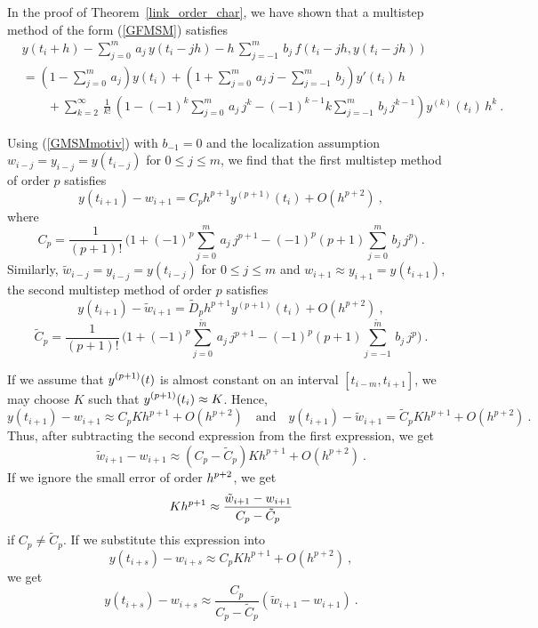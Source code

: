 In the proof of Theorem~\ref{link_order_char}, we have shown that a
multistep method of the form (\ref{GFMSM}) satisfies
\begin{align}
& y(t_i+h) - \sum_{j=0}^m\,a_j\,y(t_i-jh)
-h\,\sum_{j=-1}^m\,b_j\,f(t_i-jh,y(t_i-jh)) \nonumber \\
&= \left( 1 - \sum_{j=0}^m\,a_j \right) y(t_i)
+ \left( 1 + \sum_{j=0}^m\,a_j\,j - \sum_{j=-1}^m\,b_j\right) y'(t_i)\,h
\nonumber \\
&\qquad
+ \sum_{k=2}^\infty\,\frac{1}{k!}\,\left( 1 - (-1)^k \sum_{j=0}^m\,a_j\,j^k
- (-1)^{k-1} k \sum_{j=-1}^m\,b_j\, j^{k-1}\right) y^{(k)}(t_i)\,h^k \ .
\label{GMSMmotiv}
\end{align}

Using (\ref{GMSMmotiv}) with $b_{-1}=0$ and the localization assumption 
$w_{i-j} = y_{i-j} = y(t_{i-j})$ for $0 \leq j \leq m$, we find that
the first multistep method of order $p$ satisfies
\begin{equation} \label{VSSE1}
y(t_{i+1}) - w_{i+1} = C_p h^{p+1} y^{(p+1)}(t_i) + O(h^{p+2}) \ ,
\end{equation}
where
\[
C_p = \frac{1}{(p+1)!}\,\bigg( 1 + (-1)^p \sum_{j=0}^m\,a_j\,j^{p+1}
- (-1)^p (p+1) \sum_{j=0}^m\,b_j\, j^p\bigg) \ .
\]
Similarly, $\tilde{w}_{i-j} = y_{i-j} = y(t_{i-j})$ for $0 \leq j \leq m$
and $w_{i+1} \approx y_{i+1} = y(t_{i+1})$, the second multistep method of
order $p$ satisfies
\begin{equation} \label{VSSE2}
y(t_{i+1}) - \tilde{w}_{i+1} = \tilde{D}_p h^{p+1} y^{(p+1)}(t_i) + O(h^{p+2})
\ ,
\end{equation}
\[
\tilde{C}_p = \frac{1}{(p+1)!}\,\bigg( 1
+ (-1)^p \sum_{j=0}^{\tilde{m}}\,a_j\,j^{p+1}
- (-1)^p (p+1) \sum_{j=-1}^{\tilde{m}}\,b_j\, j^p\bigg) \ .
\]

If we assume that $\displaystyle y^{(p+1)}(t)$ is almost constant on an interval
$[t_{i-m},t_{i+1}]$, we may choose $K$ such that
$\displaystyle y^{(p+1)}(t_i) \approx K$.  Hence,
\[
y(t_{i+1}) - w_{i+1} \approx C_p K h^{p+1} + O(h^{p+2})
\quad\text{and} \quad
y(t_{i+1}) - \tilde{w}_{i+1} = \tilde{C}_p K h^{p+1} + O(h^{p+2}) \ .
\]
Thus, after subtracting the second expression from the first
expression, we get
\[
\tilde{w}_{i+1} - w_{i+1} \approx
(C_p - \tilde{C}_p) K h^{p+1} + O(h^{p+2}) \ .
\]
If we ignore the small error of order $\displaystyle h^{p+2}$, we get
\[
K h^{p+1} \approx \frac{\displaystyle \tilde{w}_{i+1} - w_{i+1}}
{\displaystyle C_p - \tilde{C}_p}
\]
if $ C_p \neq \tilde{C}_p$.  If we substitute this expression into
\[
  y(t_{i+s}) - w_{i+s} \approx C_p K h^{p+1} + O(h^{p+2}) \ ,
\]
we get
\begin{equation} \label{MSvssLocalError}
y(t_{i+s}) - w_{i+s} \approx \frac{C_p}{C_p-\tilde{C}_p}
\left( \tilde{w}_{i+1} - w_{i+1} \right) \ .
\end{equation}

